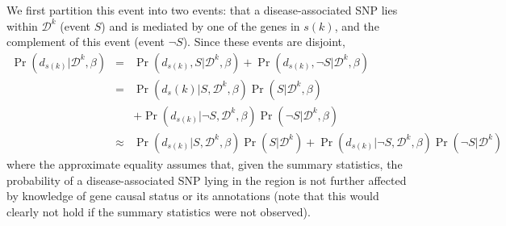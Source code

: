 \documentclass[11pt]{article}
\begin{document}
We first partition this event into two events: that a disease-associated SNP
lies within $\mathcal{D}^k$ (event $S$) and is mediated by one of the genes in $s(k)$, and the complement of this event (event $\neg S$). Since these events are disjoint,
\begin{eqnarray*}
  \Pr\left(d_{s(k)}|\mathcal{D}^k,\beta\right)
  & = &
\Pr\left(d_{s(k)},S|\mathcal{D}^k,\beta\right) +
\Pr\left(d_{s(k)},\neg S|\mathcal{D}^k,\beta\right)
  \\
  & = &
\Pr\left(d_s(k)|S,\mathcal{D}^k,\beta\right)\Pr\left(S|\mathcal{D}^k,\beta\right)
\\
& & +
\Pr\left(d_{s(k)}|\neg
S,\mathcal{D}^k,\beta\right)\Pr\left(\neg S|\mathcal{D}^k,\beta\right)
\\
  & \approx &
\Pr\left(d_{s(k)}|S,\mathcal{D}^k,\beta\right)\Pr\left(S|\mathcal{D}^k\right) + 
\Pr\left(d_{s(k)}|\neg
S,\mathcal{D}^k,\beta\right)\Pr\left(\neg S|\mathcal{D}^k\right)
\end{eqnarray*}
where the approximate equality assumes that, given the summary statistics,
the probability of a disease-associated SNP lying in the region is not
further affected by knowledge of gene causal status or its annotations
(note that this would clearly not hold if the summary statistics were
not observed).
\end{document}
